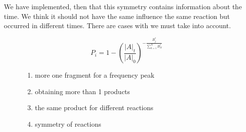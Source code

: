 \documentclass[10pt]{bmc_article}
\newenvironment{bmcformat}{\begin{raggedright}\baselineskip20pt\sloppy\setboolean{publ}{false}}{\end{raggedright}\baselineskip20pt\sloppy}
\begin{document}
\begin{bmcformat}
We have implemented, then that this symmetry contains information about the 
time. We think it should not have the same influence the same reaction but 
occurred in different times. There are cases with we must take into account.

\begin{equation}
\label{weightTotal}
P_i = 1-\left( \frac{\left |A \right 
|_t}{\left|A\right|_0}\right)^{-\frac{\textstyle B_{j}^*}{\textstyle 
\sum_{k=1}^N B_{N}^*}}
\end{equation}


\begin{center}
\begin{figure}[h]
\begin{enumerate}
\item more one fragment for a frequency peak
\item obtaining more than 1 products
\item the same product for different reactions
\item symmetry of reactions
\end{enumerate}
\label{fig:listProbleCases}
\end{figure}
\end{center}



\end{bmcformat}
\end{document}
